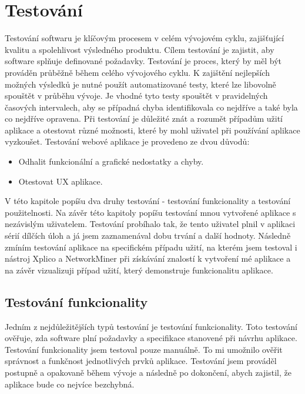 \chapter{Testování}

Testování softwaru je klíčovým procesem v celém vývojovém cyklu, zajišťující kvalitu a spolehlivost výsledného produktu. Cílem testování je zajistit, aby software splňuje definované požadavky. Testování je proces, který by měl být prováděn průběžně během celého vývojového cyklu. K zajištění nejlepších možných výsledků je nutné použít automatizované testy, které lze libovolně spouštět v průběhu vývoje. Je vhodné tyto testy spouštět v pravidelných časových intervalech, aby se případná chyba identifikovala co nejdříve a také byla co nejdříve opravena. Při testování je důležité znát a rozumět případům užití aplikace a otestovat různé možnosti, které by mohl uživatel při používání aplikace vyzkoušet. Testování webové aplikace je provedeno ze dvou důvodů:

\begin{itemize}
    \item Odhalit funkcionální a grafické nedostatky a chyby.
    \item Otestovat \gls{UX} aplikace.
\end{itemize}

V této kapitole popíšu dva druhy testování - testování funkcionality a testování použitelnosti. Na závěr této kapitoly popíšu testování mnou vytvořené aplikace s nezávislým uživatelem. Testování probíhalo tak, že tento uživatel plnil v aplikaci sérií dílčích úloh a já jsem zaznamenával dobu trvání a další hodnoty. Následně zmíním testování aplikace na specifickém případu užití, na kterém jsem testoval i nástroj Xplico a NetworkMiner při získávání znalostí k vytvoření mé aplikace a na závěr vizualizuji případ užití, který demonstruje funkcionalitu aplikace.

\section{Testování funkcionality}
Jedním z nejdůležitějších typů testování je testování funkcionality. Toto testování ověřuje, zda software plní požadavky a specifikace stanovené při návrhu aplikace. Testování funkcionality jsem testoval pouze manuálně. To mi umožnilo ověřit správnost a funkčnost jednotlivých prvků aplikace. Testování jsem prováděl postupně a opakovaně během vývoje a následně po dokončení, abych zajistil, že aplikace bude co nejvíce bezchybná. 

